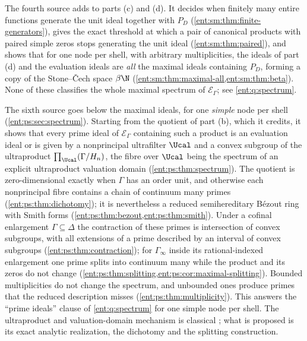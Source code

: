 \documentclass[11pt]{article}
\theoremstyle{plain}
\theoremstyle{plain}
\theoremstyle{plain}
\theoremstyle{definition}
\theoremstyle{definition}
\theoremstyle{definition}
\theoremstyle{definition}
\theoremstyle{remark}
\newcommand{\E}{\mathcal E_\Gamma}
\begin{document}
The fourth source adds to parts (c) and (d). It decides when finitely many
entire functions generate the unit ideal together with $P_D$
(\cref{ent:sm:thm:finite-generators}), gives the exact threshold at which a
pair of canonical products with paired simple zeros stops generating the
unit ideal (\cref{ent:sm:thm:paired}), and shows that for one node per shell,
with arbitrary multiplicities, the ideals of part (d) and the evaluation
ideals are \emph{all} the maximal ideals containing $P_D$, forming a copy of
the Stone--\v{C}ech space $\beta\N$
(\cref{ent:sm:thm:maximal-all,ent:sm:thm:beta}). None of these classifies
the whole maximal spectrum of $\E$; see \cref{ent:q:spectrum}.

The sixth source goes below the maximal ideals, for one \emph{simple} node
per shell (\cref{ent:ps:sec:spectrum}). Starting from the quotient of part
(b), which it credits, it shows that every prime ideal of $\E$ containing
such a product is an evaluation ideal or is given by a nonprincipal
ultrafilter $\Ucal$ and a convex subgroup of the ultraproduct
$\prod_\Ucal(\Gamma/H_n)$, the fibre over $\Ucal$ being the spectrum of an
explicit ultraproduct valuation domain (\cref{ent:ps:thm:spectrum}). The
quotient is zero-dimensional exactly when $\Gamma$ has an order unit, and
otherwise each nonprincipal fibre contains a chain of continuum many primes
(\cref{ent:ps:thm:dichotomy}); it is nevertheless a reduced semihereditary
B\'ezout ring with Smith forms (\cref{ent:ps:thm:bezout,ent:ps:thm:smith}).
Under a cofinal enlargement $\Gamma\subseteq\Delta$ the contraction of these
primes is intersection of convex subgroups, with all extensions of a prime
described by an interval of convex subgroups
(\cref{ent:ps:thm:contraction}); for $\Gamma_\infty$ inside its
rational-indexed enlargement one prime splits into continuum many while the
product and its zeros do not change
(\cref{ent:ps:thm:splitting,ent:ps:cor:maximal-splitting}). Bounded
multiplicities do not change the spectrum, and unbounded ones produce primes
that the reduced description misses (\cref{ent:ps:thm:multiplicity}). This
answers the ``prime ideals'' clause of \cref{ent:q:spectrum} for one simple
node per shell. The ultraproduct and valuation-domain mechanism is classical
\cite{FFW,StacksValuation}; what is proposed is its exact analytic
realization, the dichotomy and the splitting construction.
\end{document}
